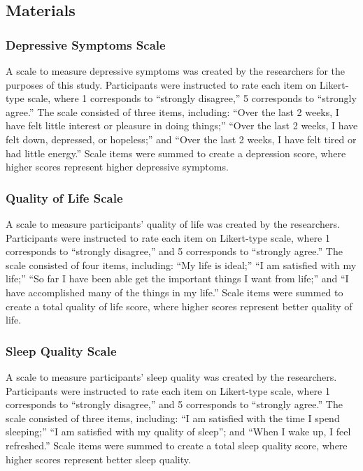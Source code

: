 \documentclass[man, noextraspace]{apa6}
\theoremstyle{definition}
\theoremstyle{definition}
\theoremstyle{definition}
\theoremstyle{remark}
\begin{document}
\subsection{Materials}\label{materials}

\subsubsection{Depressive Symptoms
Scale}\label{depressive-symptoms-scale}

A scale to measure depressive symptoms was created by the researchers
for the purposes of this study. Participants were instructed to rate
each item on Likert-type scale, where 1 corresponds to \enquote{strongly
disagree,} 5 corresponds to \enquote{strongly agree.} The scale
consisted of three items, including: \enquote{Over the last 2 weeks, I
have felt little interest or pleasure in doing things;} \enquote{Over
the last 2 weeks, I have felt down, depressed, or hopeless;} and
\enquote{Over the last 2 weeks, I have felt tired or had little energy.}
Scale items were summed to create a depression score, where higher
scores represent higher depressive symptoms.

\subsubsection{Quality of Life Scale}\label{quality-of-life-scale}

A scale to measure participants' quality of life was created by the
researchers. Participants were instructed to rate each item on
Likert-type scale, where 1 corresponds to \enquote{strongly disagree,}
and 5 corresponds to \enquote{strongly agree.} The scale consisted of
four items, including: \enquote{My life is ideal;} \enquote{I am
satisfied with my life;} \enquote{So far I have been able get the
important things I want from life;} and \enquote{I have accomplished
many of the things in my life.} Scale items were summed to create a
total quality of life score, where higher scores represent better
quality of life.

\subsubsection{Sleep Quality Scale}\label{sleep-quality-scale}

A scale to measure participants' sleep quality was created by the
researchers. Participants were instructed to rate each item on
Likert-type scale, where 1 corresponds to \enquote{strongly disagree,}
and 5 corresponds to \enquote{strongly agree.} The scale consisted of
three items, including: \enquote{I am satisfied with the time I spend
sleeping;} \enquote{I am satisfied with my quality of sleep}; and
\enquote{When I wake up, I feel refreshed.} Scale items were summed to
create a total sleep quality score, where higher scores represent better
sleep quality.
\end{document}
